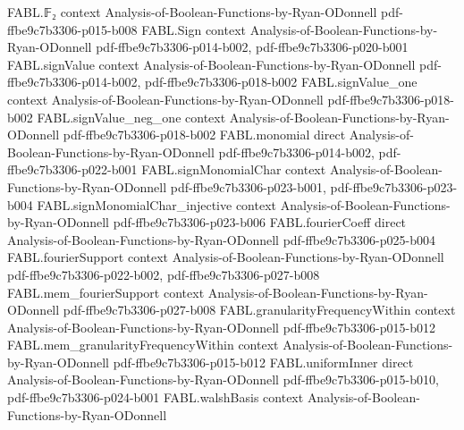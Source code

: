 \begin{theorem}
\label{FABL.isLocalTester_of_close_of_acceptanceProbability_ge}
\leanok
{}
\proofstep
  {FABL.𝔽₂}
  {context}
  {Analysis-of-Boolean-Functions-by-Ryan-ODonnell}
  {pdf-ffbe9c7b3306-p015-b008}
\proofstep
  {FABL.Sign}
  {context}
  {Analysis-of-Boolean-Functions-by-Ryan-ODonnell}
  {pdf-ffbe9c7b3306-p014-b002,
    pdf-ffbe9c7b3306-p020-b001}
\proofstep
  {FABL.signValue}
  {context}
  {Analysis-of-Boolean-Functions-by-Ryan-ODonnell}
  {pdf-ffbe9c7b3306-p014-b002,
    pdf-ffbe9c7b3306-p018-b002}
\proofstep
  {FABL.signValue_one}
  {context}
  {Analysis-of-Boolean-Functions-by-Ryan-ODonnell}
  {pdf-ffbe9c7b3306-p018-b002}
\proofstep
  {FABL.signValue_neg_one}
  {context}
  {Analysis-of-Boolean-Functions-by-Ryan-ODonnell}
  {pdf-ffbe9c7b3306-p018-b002}
\proofstep
  {FABL.monomial}
  {direct}
  {Analysis-of-Boolean-Functions-by-Ryan-ODonnell}
  {pdf-ffbe9c7b3306-p014-b002,
    pdf-ffbe9c7b3306-p022-b001}
\proofstep
  {FABL.signMonomialChar}
  {context}
  {Analysis-of-Boolean-Functions-by-Ryan-ODonnell}
  {pdf-ffbe9c7b3306-p023-b001,
    pdf-ffbe9c7b3306-p023-b004}
\proofstep
  {FABL.signMonomialChar_injective}
  {context}
  {Analysis-of-Boolean-Functions-by-Ryan-ODonnell}
  {pdf-ffbe9c7b3306-p023-b006}
\proofstep
  {FABL.fourierCoeff}
  {direct}
  {Analysis-of-Boolean-Functions-by-Ryan-ODonnell}
  {pdf-ffbe9c7b3306-p025-b004}
\proofstep
  {FABL.fourierSupport}
  {context}
  {Analysis-of-Boolean-Functions-by-Ryan-ODonnell}
  {pdf-ffbe9c7b3306-p022-b002,
    pdf-ffbe9c7b3306-p027-b008}
\proofstep
  {FABL.mem_fourierSupport}
  {context}
  {Analysis-of-Boolean-Functions-by-Ryan-ODonnell}
  {pdf-ffbe9c7b3306-p027-b008}
\proofstep
  {FABL.granularityFrequencyWithin}
  {context}
  {Analysis-of-Boolean-Functions-by-Ryan-ODonnell}
  {pdf-ffbe9c7b3306-p015-b012}
\proofstep
  {FABL.mem_granularityFrequencyWithin}
  {context}
  {Analysis-of-Boolean-Functions-by-Ryan-ODonnell}
  {pdf-ffbe9c7b3306-p015-b012}
\proofstep
  {FABL.uniformInner}
  {direct}
  {Analysis-of-Boolean-Functions-by-Ryan-ODonnell}
  {pdf-ffbe9c7b3306-p015-b010,
    pdf-ffbe9c7b3306-p024-b001}
\proofstep
  {FABL.walshBasis}
  {context}
  {Analysis-of-Boolean-Functions-by-Ryan-ODonnell}

\end{theorem}

